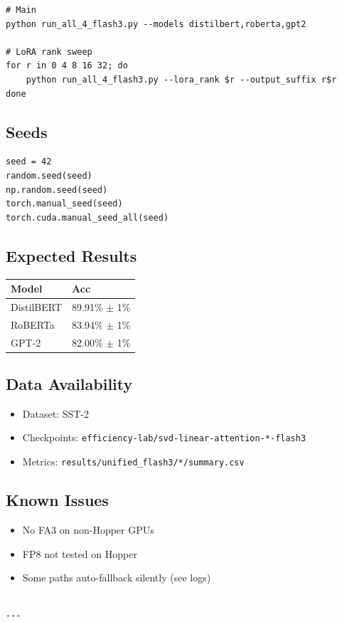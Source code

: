 \begin{lstlisting}
# Main
python run_all_4_flash3.py --models distilbert,roberta,gpt2

# LoRA rank sweep
for r in 0 4 8 16 32; do
    python run_all_4_flash3.py --lora_rank $r --output_suffix r$r
done
\end{lstlisting}

\subsection{Seeds}

\begin{lstlisting}
seed = 42
random.seed(seed)
np.random.seed(seed)
torch.manual_seed(seed)
torch.cuda.manual_seed_all(seed)
\end{lstlisting}

\subsection{Expected Results}

\begin{table}[H]
\centering
\small
\begin{tabular}{ll}
\toprule
\textbf{Model} & \textbf{Acc} \\
\midrule
DistilBERT & 89.91\% $\pm$ 1\% \\
RoBERTa & 83.94\% $\pm$ 1\% \\
GPT-2 & 82.00\% $\pm$ 1\% \\
\bottomrule
\end{tabular}
\end{table}

\subsection{Data Availability}

\begin{itemize}
\item Dataset: SST-2
\item Checkpoints: \texttt{efficiency-lab/svd-linear-attention-*-flash3}
\item Metrics: \texttt{results/unified\_flash3/*/summary.csv}

\end{itemize}
\subsection{Known Issues}

\begin{itemize}
\item No FA3 on non-Hopper GPUs
\item FP8 not tested on Hopper
\item Some paths auto-fallback silently (see logs)
\end{itemize}
\begin{lstlisting}

---
\end{lstlisting}